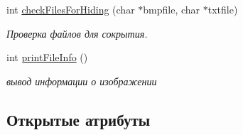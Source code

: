 \begin{DoxyCompactItemize}
int \hyperlink{classBmpFile_abfcc28bca4d0113ad37ce2e1f2547a21}{check\+Files\+For\+Hiding} (char $\ast$bmpfile, char $\ast$txtfile)
\begin{DoxyCompactList}\small\item\em Проверка файлов для сокрытия. \end{DoxyCompactList}\item 
int \hyperlink{classBmpFile_acd76df84283673fd0bfc32b8edb8239b}{print\+File\+Info} ()
\begin{DoxyCompactList}\small\item\em вывод информации о изображении \end{DoxyCompactList}\end{DoxyCompactItemize}
\subsection*{Открытые атрибуты}
